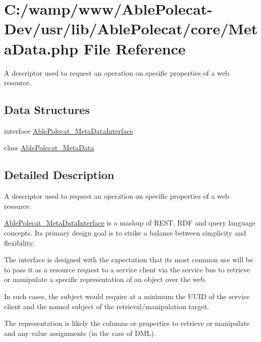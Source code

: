 \hypertarget{_meta_data_8php}{}\section{C\+:/wamp/www/\+Able\+Polecat-\/\+Dev/usr/lib/\+Able\+Polecat/core/\+Meta\+Data.php File Reference}
\label{_meta_data_8php}


A descriptor used to request an operation on specific properties of a web resource.  


\subsection*{Data Structures}
\begin{DoxyCompactItemize}
\item 
interface \hyperlink{interface_able_polecat___meta_data_interface}{Able\+Polecat\+\_\+\+Meta\+Data\+Interface}
\item 
class \hyperlink{class_able_polecat___meta_data}{Able\+Polecat\+\_\+\+Meta\+Data}
\end{DoxyCompactItemize}


\subsection{Detailed Description}
A descriptor used to request an operation on specific properties of a web resource. 

\hyperlink{interface_able_polecat___meta_data_interface}{Able\+Polecat\+\_\+\+Meta\+Data\+Interface} is a mashup of R\+E\+S\+T, R\+D\+F and query language concepts. It\textquotesingle{}s primary design goal is to strike a balance between simplicity and flexibility.

The interface is designed with the expectation that its most common use will be to pass it as a resource request to a service client via the service bus to retrieve or manipulate a specific representation of an object over the web.

In such cases, the \textquotesingle{}subject\textquotesingle{} would require at a minimum the U\+U\+I\+D of the service client and the named subject of the retrieval/manipulation target.

The representation is likely the columns or properties to retrieve or manipulate and any value assignments (in the case of D\+M\+L).

